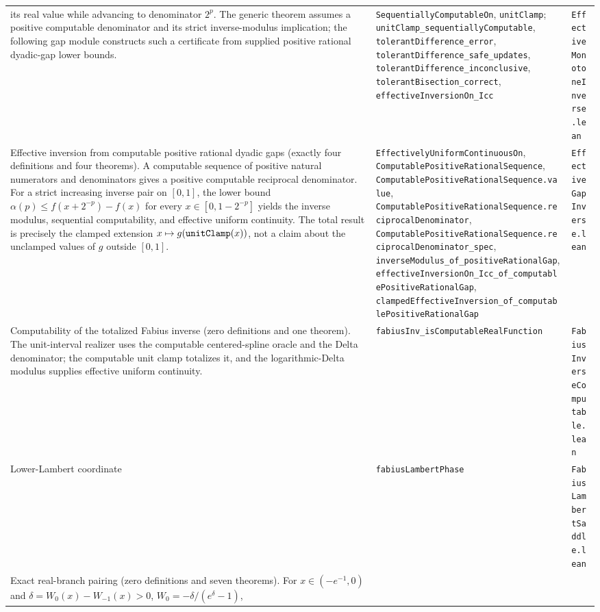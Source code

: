 \documentclass[11pt,oneside]{article}
\theoremstyle{definition}
\theoremstyle{remark}
\newcommand{\lean}[1]{%
  \ifmmode\text{\texttt{\detokenize{#1}}}\else\nolinkurl{#1}\fi}
\begin{document}
\begin{longtable}{@{}p{}p{}p{}@{}}
its real value while advancing to denominator \(2^p\).  The generic theorem
assumes a positive computable denominator and its strict inverse-modulus
implication; the following gap module constructs such a certificate from
supplied positive rational dyadic-gap lower bounds. &
\nolinkurl{SequentiallyComputableOn},
\nolinkurl{unitClamp};
\nolinkurl{unitClamp_sequentiallyComputable},
\nolinkurl{tolerantDifference_error},
\nolinkurl{tolerantDifference_safe_updates},
\nolinkurl{tolerantDifference_inconclusive},
\nolinkurl{tolerantBisection_correct},
\nolinkurl{effectiveInversionOn_Icc} &
\nolinkurl{EffectiveMonotoneInverse.lean} \\
Effective inversion from computable positive rational dyadic gaps (exactly
four definitions and four theorems).  A computable sequence of positive natural
numerators and denominators gives a positive computable reciprocal denominator.
For a strict increasing inverse pair on \([0,1]\), the lower bound
\(\alpha(p)\le f(x+2^{-p})-f(x)\) for every
\(x\in[0,1-2^{-p}]\) yields the inverse modulus, sequential computability,
and effective uniform continuity.  The total result is precisely the clamped
extension \(x\mapsto g(\lean{unitClamp}(x))\), not a claim about the
unclamped values of \(g\) outside \([0,1]\). &
\nolinkurl{EffectivelyUniformContinuousOn},
\nolinkurl{ComputablePositiveRationalSequence},
\nolinkurl{ComputablePositiveRationalSequence.value},
\nolinkurl{ComputablePositiveRationalSequence.reciprocalDenominator},
\nolinkurl{ComputablePositiveRationalSequence.reciprocalDenominator_spec},
\nolinkurl{inverseModulus_of_positiveRationalGap},
\nolinkurl{effectiveInversionOn_Icc_of_computablePositiveRationalGap},
\nolinkurl{clampedEffectiveInversion_of_computablePositiveRationalGap} &
\nolinkurl{EffectiveGapInverse.lean} \\
Computability of the totalized Fabius inverse (zero definitions and one
theorem).  The unit-interval realizer uses the computable centered-spline
oracle and the Delta denominator; the computable unit clamp totalizes it, and
the logarithmic-Delta modulus supplies effective uniform continuity. &
\nolinkurl{fabiusInv_isComputableRealFunction} &
\nolinkurl{FabiusInverseComputable.lean} \\
Lower-Lambert coordinate & \nolinkurl{fabiusLambertPhase} & \nolinkurl{FabiusLambertSaddle.lean} \\
Exact real-branch pairing (zero definitions and seven theorems).  For
\(x\in(-e^{-1},0)\) and
\(\delta=W_0(x)-W_{-1}(x)>0\),
\(W_0=-\delta/(e^\delta-1)\),
\(W_{-1}=-\delta e^\delta/(e^\delta-1)

\end{longtable}
\end{document}

